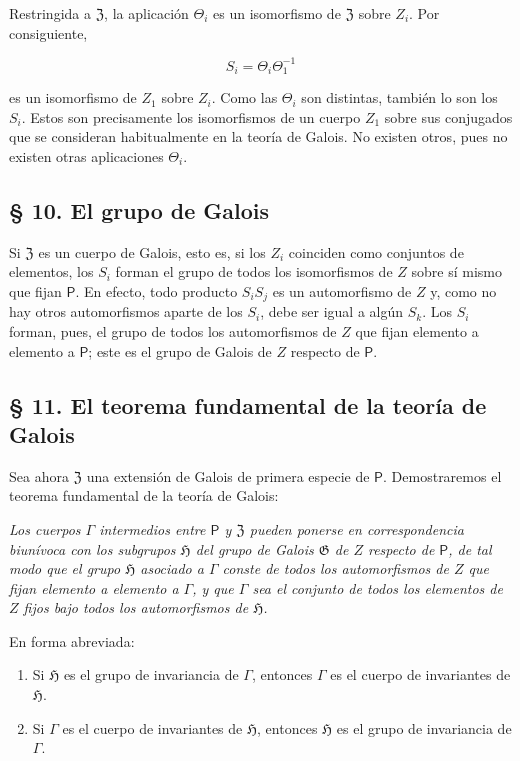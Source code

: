 Restringida a $\mathfrak Z$, la aplicación $\Theta_i$ es un isomorfismo de $\mathfrak Z$ sobre $Z_i$. Por consiguiente,

\[
S_i=\Theta_i\Theta_1^{-1}
\]

es un isomorfismo de $Z_1$ sobre $Z_i$. Como las $\Theta_i$ son distintas, también lo son los $S_i$. Estos son precisamente los isomorfismos de un cuerpo $Z_1$ sobre sus conjugados que se consideran habitualmente en la teoría de Galois. No existen otros, pues no existen otras aplicaciones $\Theta_i$.

\subsection*{§ 10. El grupo de Galois}

Si $\mathfrak Z$ es un cuerpo de Galois, esto es, si los $Z_i$ coinciden como conjuntos de elementos, los $S_i$ forman el grupo de todos los isomorfismos de $Z$ sobre sí mismo que fijan $\mathsf P$. En efecto, todo producto $S_iS_j$ es un automorfismo de $Z$ y, como no hay otros automorfismos aparte de los $S_i$, debe ser igual a algún $S_k$. Los $S_i$ forman, pues, el grupo de todos los automorfismos de $Z$ que fijan elemento a elemento a $\mathsf P$; este es el grupo de Galois de $Z$ respecto de $\mathsf P$.

\subsection*{§ 11. El teorema fundamental de la teoría de Galois}

Sea ahora $\mathfrak Z$ una extensión de Galois de primera especie de $\mathsf P$. Demostraremos el teorema fundamental de la teoría de Galois:

\emph{Los cuerpos $\Gamma$ intermedios entre $\mathsf P$ y $\mathfrak Z$ pueden ponerse en correspondencia biunívoca con los subgrupos $\mathfrak H$ del grupo de Galois $\mathfrak G$ de $Z$ respecto de $\mathsf P$, de tal modo que el grupo $\mathfrak H$ asociado a $\Gamma$ conste de todos los automorfismos de $Z$ que fijan elemento a elemento a $\Gamma$, y que $\Gamma$ sea el conjunto de todos los elementos de $Z$ fijos bajo todos los automorfismos de $\mathfrak H$.}

En forma abreviada:

\begin{enumerate}
\item Si $\mathfrak H$ es el grupo de invariancia de $\Gamma$, entonces $\Gamma$ es el cuerpo de invariantes de $\mathfrak H$.
\item Si $\Gamma$ es el cuerpo de invariantes de $\mathfrak H$, entonces $\mathfrak H$ es el grupo de invariancia de $\Gamma$.
\end{enumerate}

